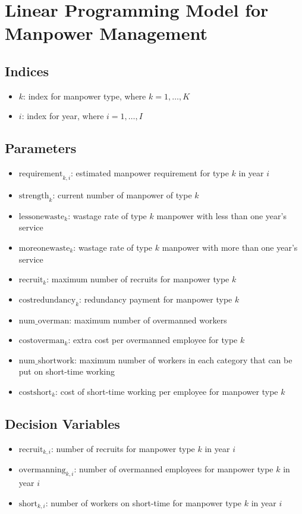 \documentclass{article}
\begin{document}
\section*{Linear Programming Model for Manpower Management}

\subsection*{Indices}
\begin{itemize}
    \item \( k \): index for manpower type, where \( k = 1, \ldots, K \)
    \item \( i \): index for year, where \( i = 1, \ldots, I \)
\end{itemize}

\subsection*{Parameters}
\begin{itemize}
    \item \( \text{requirement}_{k, i} \): estimated manpower requirement for type \( k \) in year \( i \)
    \item \( \text{strength}_{k} \): current number of manpower of type \( k \)
    \item \( \text{lessonewaste}_{k} \): wastage rate of type \( k \) manpower with less than one year's service
    \item \( \text{moreonewaste}_{k} \): wastage rate of type \( k \) manpower with more than one year's service
    \item \( \text{recruit}_{k} \): maximum number of recruits for manpower type \( k \)
    \item \( \text{costredundancy}_{k} \): redundancy payment for manpower type \( k \)
    \item \( \text{num\_overman} \): maximum number of overmanned workers
    \item \( \text{costoverman}_{k} \): extra cost per overmanned employee for type \( k \)
    \item \( \text{num\_shortwork} \): maximum number of workers in each category that can be put on short-time working
    \item \( \text{costshort}_{k} \): cost of short-time working per employee for manpower type \( k \)
\end{itemize}

\subsection*{Decision Variables}
\begin{itemize}
    \item \( \text{recruit}_{k, i} \): number of recruits for manpower type \( k \) in year \( i \)
    \item \( \text{overmanning}_{k, i} \): number of overmanned employees for manpower type \( k \) in year \( i \)
    \item \( \text{short}_{k, i} \): number of workers on short-time for manpower type \( k \) in year \( i \)
\end{itemize}
\end{document}

